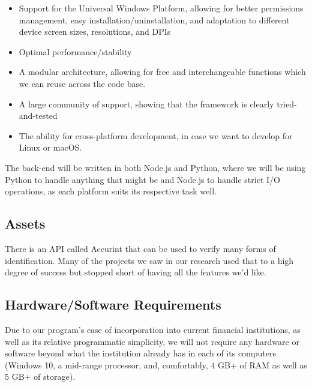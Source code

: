 \begin{itemize}
    \item Support for the Universal Windows Platform, allowing for better permissions management, easy installation/uninstallation, and adaptation to different device screen sizes, resolutions, and DPIs
    \item Optimal performance/stability
    \item A modular architecture, allowing for free and interchangeable functions which we can reuse across the code base.
    \item A large community of support, showing that the framework is clearly tried-and-tested
    \item The ability for cross-platform development, in case we want to develop for Linux or macOS.
\end{itemize}

The back-end will be written in both Node.js and Python, where we will be using Python to handle anything that might be and Node.js to handle strict I/O operations, as each platform suits its respective task well.

\subsection{Assets}

There is an API called Accurint that can be used to verify many forms of identification. Many of the projects we saw in our research used that to a high degree of success but stopped short of having all the features we’d like.

\subsection{Hardware/Software Requirements}

Due to our program’s ease of incorporation into current financial institutions, as well as its relative programmatic simplicity, we will not require any hardware or software beyond what the institution already has in each of its computers (Windows 10, a mid-range processor, and, comfortably, 4 GB+ of RAM as well as 5 GB+ of storage).   